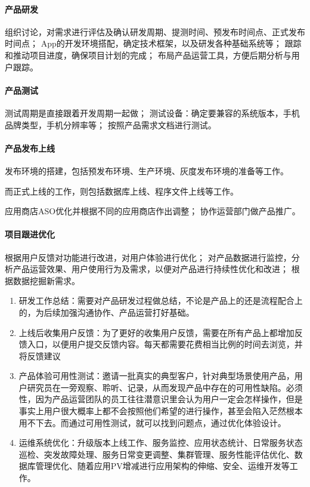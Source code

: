 \documentclass[letterpaper,11pt,english]{sphinxmanual}
\begin{document}
\paragraph{产品研发}
\label{\detokenize{chapter_project/process:id9}}
组织讨论，对需求进行评估及确认研发周期、提测时间、预发布时间点、正式发布时间点；
App的开发环境搭配，确定技术框架，以及研发各种基础系统等；
跟踪和推动项目进度，确保项目计划的完成；
布局产品运营工具，方便后期分析与用户跟踪。


\paragraph{产品测试}
\label{\detokenize{chapter_project/process:id10}}
测试周期是直接跟着开发周期一起做；
测试设备：确定要兼容的系统版本，手机品牌类型，手机分辨率等；
按照产品需求文档进行测试。


\paragraph{产品发布上线}
\label{\detokenize{chapter_project/process:id11}}
发布环境的搭建，包括预发布环境、生产环境、灰度发布环境的准备等工作。

而正式上线的工作，则包括数据库上线、程序文件上线等工作。

应用商店ASO优化并根据不同的应用商店作出调整； 协作运营部门做产品推广。


\paragraph{项目跟进优化}
\label{\detokenize{chapter_project/process:id12}}
根据用户反馈对功能进行改进，对用户体验进行优化；
对产品数据进行监控，分析产品运营效果、用户使用行为及需求，以便对产品进行持续性优化和改进；
根据数据挖掘新需求。
\begin{enumerate}
%
\item {} 
研发工作总结：需要对产品研发过程做总结，不论是产品上的还是流程配合上的，为后续加强沟通协作、产品运营打好基础。

\item {} 
上线后收集用户反馈：为了更好的收集用户反馈，需要在所有产品上都增加反馈入口，以便用户提交反馈内容。每天都需要花费相当比例的时间去浏览，并将反馈建议

\item {} 
产品体验可用性测试：邀请一批真实的典型客户，针对典型场景使用产品，用户研究员在一旁观察、聆听、记录，从而发现产品中存在的可用性缺陷。必须性，因为产品运营团队的员工往往潜意识里会认为用户一定会怎样操作，但是事实上用户很大概率上都不会按照他们希望的进行操作，甚至会陷入茫然根本用不下去。而通过可用性测试，就可以找到问题点，通过优化体验设计。

\item {} 
运维系统优化：升级版本上线工作、服务监控、应用状态统计、日常服务状态巡检、突发故障处理、服务日常变更调整、集群管理、服务性能评估优化、数据库管理优化、随着应用PV增减进行应用架构的伸缩、安全、运维开发等工作。

\end{enumerate}
\end{document}
